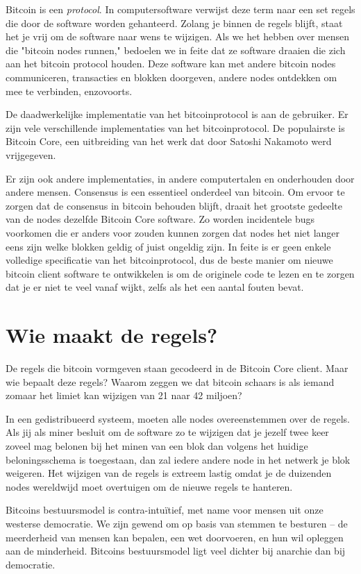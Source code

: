 Bitcoin is een \textit{protocol}. In computersoftware verwijst deze term naar een set regels die door de software worden gehanteerd. Zolang je binnen de regels blijft, staat het je vrij om de software naar wens te wijzigen. Als we het hebben over mensen die "bitcoin nodes runnen," bedoelen we in feite dat ze software draaien die zich aan het bitcoin protocol houden. Deze software kan met andere bitcoin nodes communiceren, transacties en blokken doorgeven, andere nodes ontdekken om mee te verbinden, enzovoorts.   

De daadwerkelijke implementatie van het bitcoinprotocol is aan de gebruiker. Er zijn vele verschillende implementaties van het bitcoinprotocol. De populairste is Bitcoin Core, een uitbreiding van het werk dat door Satoshi Nakamoto werd vrijgegeven.

Er zijn ook andere implementaties, in andere computertalen en onderhouden door andere mensen. Consensus is een essentieel onderdeel van bitcoin. Om ervoor te zorgen dat de consensus in bitcoin behouden blijft, draait het grootste gedeelte van de nodes dezelfde Bitcoin Core software. Zo worden incidentele bugs voorkomen die er anders voor zouden kunnen zorgen dat nodes het niet langer eens zijn welke blokken geldig of juist ongeldig zijn. In feite is er geen enkele volledige specificatie van het bitcoinprotocol, dus de beste manier om nieuwe bitcoin client software te ontwikkelen is om de originele code te lezen en te zorgen dat je er niet te veel vanaf wijkt, zelfs als het een aantal fouten bevat.

\section{Wie maakt de regels?}

De regels die bitcoin vormgeven staan gecodeerd in de Bitcoin Core client. Maar wie bepaalt deze regels? Waarom zeggen we dat bitcoin schaars is als iemand zomaar het limiet kan wijzigen van 21 naar 42 miljoen?

In een gedistribueerd systeem, moeten alle nodes overeenstemmen over de regels. Als jij als miner besluit om de software zo te wijzigen dat je jezelf twee keer zoveel mag belonen bij het minen van een blok dan volgens het huidige beloningsschema is toegestaan, dan zal iedere andere node in het netwerk je blok weigeren. Het wijzigen van de regels is extreem lastig omdat je de duizenden nodes wereldwijd moet overtuigen om de nieuwe regels te hanteren.

Bitcoins bestuursmodel is contra-intuïtief, met name voor mensen uit onze westerse democratie. We zijn gewend om op basis van stemmen te besturen -- de meerderheid van mensen kan bepalen, een wet doorvoeren, en hun wil opleggen aan de minderheid. Bitcoins bestuursmodel ligt veel dichter bij anarchie dan bij democratie.

